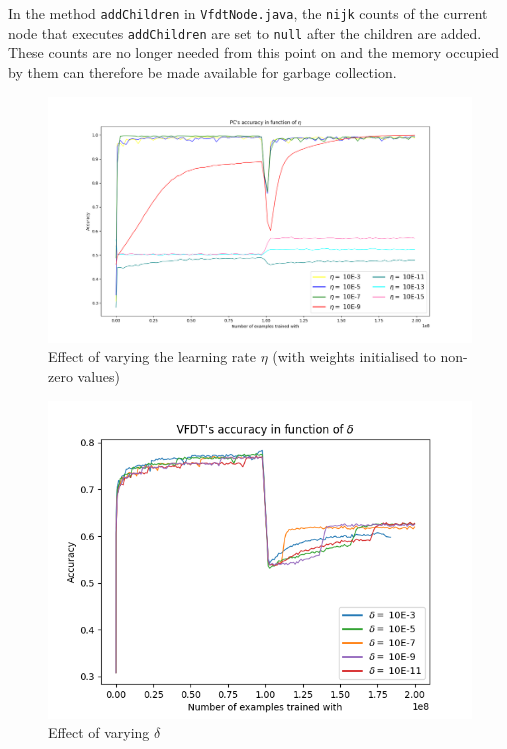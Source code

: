 \documentclass[12pt]{article}
\begin{document}
In the method \texttt{addChildren} in \texttt{VfdtNode.java}, the \texttt{nijk} counts of the current node that executes \texttt{addChildren} are set to \texttt{null} after the children are added. These counts are no longer needed from this point on and the memory occupied by them can therefore be made available for garbage collection.



\begin{figure}
	
	\centering
	\includegraphics[width=1.6\linewidth, center]{./img/pc_etas.png}
	\caption{Effect of varying the learning rate $\eta$ (with weights initialised to non-zero values)}
	\label{fig:pc_etas}	
\end{figure}
\begin{figure}
	\centering
	\includegraphics[width=.8\linewidth]{./img/vfdt_delta.png}
	\caption{Effect of varying $\delta$}
	\label{fig:vfdt_deltas}	
\end{figure}
\end{document}
